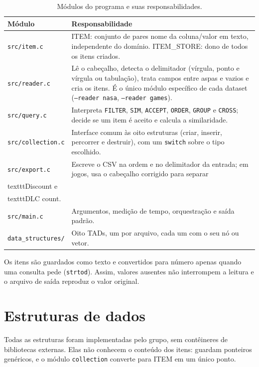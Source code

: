 \documentclass[11pt,a4paper]{article}
\newcommand{\cab}[1]{\rowcolor{gray!22}#1}
\begin{document}
\begin{table}[!htbp]
\centering
\caption{Módulos do programa e suas responsabilidades.}
\small
\begin{tabularx}{\textwidth}{@{}l Y@{}}
\toprule
\cab{\textbf{Módulo} & \textbf{Responsabilidade}} \\
\midrule
\texttt{src/\allowbreak{}item.c} & ITEM: conjunto de pares nome da coluna/valor em texto, independente do domínio. ITEM\_STORE: dono de todos os itens criados. \\
\texttt{src/\allowbreak{}reader.c} & Lê o cabeçalho, detecta o delimitador (vírgula, ponto e vírgula ou tabulação), trata campos entre aspas e vazios e cria os itens. É o único módulo específico de cada dataset (\texttt{--reader nasa}, \texttt{--reader games}). \\
\texttt{src/\allowbreak{}query.c} & Interpreta \texttt{FILTER}, \texttt{SIM}, \texttt{ACCEPT}, \texttt{ORDER}, \texttt{GROUP} e \texttt{CROSS}; decide se um item é aceito e calcula a similaridade. \\
\texttt{src/\allowbreak{}collection.c} & Interface comum às oito estruturas (criar, inserir, percorrer e destruir), com um \texttt{switch} sobre o tipo escolhido. \\
\texttt{src/\allowbreak{}export.c} & Escreve o CSV na ordem e no delimitador da entrada; em jogos, usa o cabeçalho corrigido para separar \\texttt{Discount} e \\texttt{DLC count}. \\
\texttt{src/\allowbreak{}main.c} & Argumentos, medição de tempo, orquestração e saída padrão. \\
\texttt{data\_\allowbreak{}structures/\allowbreak{}} & Oito TADs, um por arquivo, cada um com o seu nó ou vetor. \\
\bottomrule
\end{tabularx}
\end{table}

Os itens são guardados como texto e convertidos para número apenas quando uma consulta pede (\texttt{strtod}). Assim, valores ausentes não interrompem a leitura e o arquivo de saída reproduz o valor original.

\section{Estruturas de dados}

Todas as estruturas foram implementadas pelo grupo, sem contêineres de bibliotecas externas. Elas não conhecem o conteúdo dos itens: guardam ponteiros genéricos, e o módulo \texttt{collection} converte para ITEM em um único ponto.
\end{document}
